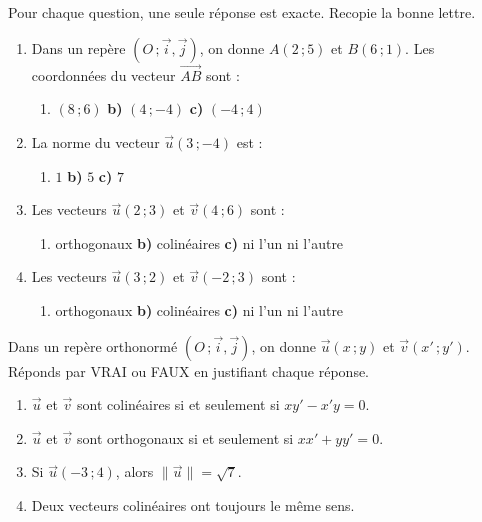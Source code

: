 \documentclass[11pt]{article}
\begin{document}
\begin{exercice}
Pour chaque question, une seule réponse est exacte. Recopie la bonne lettre.
\begin{enumerate}
\item Dans un repère $(O\,;\vec{i},\vec{j})$, on donne $A(2\,;5)$ et $B(6\,;1)$. Les coordonnées du vecteur $\overrightarrow{AB}$ sont :
\begin{enumerate}
\item $(8\,;6)$ \qquad \textbf{b)} $(4\,;-4)$ \qquad \textbf{c)} $(-4\,;4)$
\end{enumerate}
\item La norme du vecteur $\vec{u}(3\,;-4)$ est :
\begin{enumerate}
\item $1$ \qquad \textbf{b)} $5$ \qquad \textbf{c)} $7$
\end{enumerate}
\item Les vecteurs $\vec{u}(2\,;3)$ et $\vec{v}(4\,;6)$ sont :
\begin{enumerate}
\item orthogonaux \qquad \textbf{b)} colinéaires \qquad \textbf{c)} ni l'un ni l'autre
\end{enumerate}
\item Les vecteurs $\vec{u}(3\,;2)$ et $\vec{v}(-2\,;3)$ sont :
\begin{enumerate}
\item orthogonaux \qquad \textbf{b)} colinéaires \qquad \textbf{c)} ni l'un ni l'autre
\end{enumerate}
\end{enumerate}
\end{exercice}

\begin{exercice}
Dans un repère orthonormé $(O\,;\vec{i},\vec{j})$, on donne $\vec{u}(x\,;y)$ et $\vec{v}(x'\,;y')$. Réponds par VRAI ou FAUX en justifiant chaque réponse.
\begin{enumerate}
\item $\vec{u}$ et $\vec{v}$ sont colinéaires si et seulement si $xy' - x'y = 0$.
\item $\vec{u}$ et $\vec{v}$ sont orthogonaux si et seulement si $xx' + yy' = 0$.
\item Si $\vec{u}(-3\,;4)$, alors $\|\vec{u}\| = \sqrt{7}$.
\item Deux vecteurs colinéaires ont toujours le même sens.
\end{enumerate}
\end{exercice}
\end{document}

